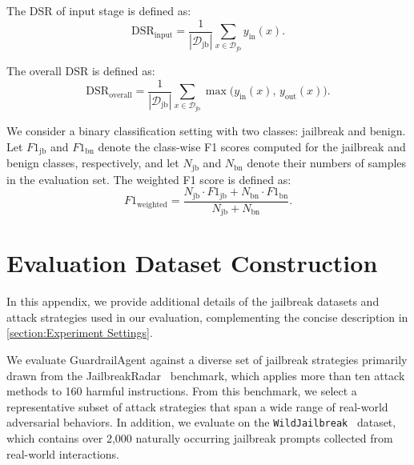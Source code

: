 \documentclass[letterpaper,twocolumn,10pt]{article}
\newcommand{\mypara}[1]{\noindent{\bf {#1}.} \xspace}
\newcommand{\agentname}{GuardrailAgent\xspace}
\begin{document}
The DSR of input stage is defined as:
\begin{equation}
\mathrm{DSR}_{\text{input}} =
\frac{1}{|\mathcal{D}_{\text{jb}}|}
\sum_{x \in \mathcal{D}_{\text{jb}}} y_{\text{in}}(x).
\end{equation}

The overall DSR is defined as:
\begin{equation}
\mathrm{DSR}_{\text{overall}} =
\frac{1}{|\mathcal{D}_{\text{jb}}|}
\sum_{x \in \mathcal{D}_{\text{jb}}}
\max\bigl(y_{\text{in}}(x),\, y_{\text{out}}(x)\bigr).
\end{equation}

\mypara{Weighted F1 Score}
We consider a binary classification setting with two classes: jailbreak and benign.
Let $\textit{F1}_{\text{jb}}$ and $\textit{F1}_{\text{bn}}$ denote the class-wise F1 scores computed for the jailbreak and benign classes, respectively, and let $N_{\text{jb}}$ and $N_{\text{bn}}$ denote their numbers of samples in the evaluation set.
The weighted F1 score is defined as:
\begin{equation}
\textit{F1}_{\text{weighted}} =
\frac{N_{\text{jb}} \cdot \textit{F1}_{\text{jb}} + N_{\text{bn}} \cdot \textit{F1}_{\text{bn}}}
{N_{\text{jb}} + N_{\text{bn}}}.
\end{equation}

\section{Evaluation Dataset Construction}
\label{appendix:dataset}

In this appendix, we provide additional details of the jailbreak datasets and attack strategies used in our evaluation, complementing the concise description in \autoref{section:Experiment Settings}.

We evaluate \agentname against a diverse set of jailbreak strategies primarily drawn from the JailbreakRadar~\cite{CLYSBZ25} benchmark, which applies more than ten attack methods to 160 harmful instructions. From this benchmark, we select a representative subset of attack strategies that span a wide range of real-world adversarial behaviors.
In addition, we evaluate on the \texttt{WildJailbreak}~\cite{JRHEBKMLSCD24} dataset, which contains over 2,000 naturally occurring jailbreak prompts collected from real-world interactions.
\end{document}
